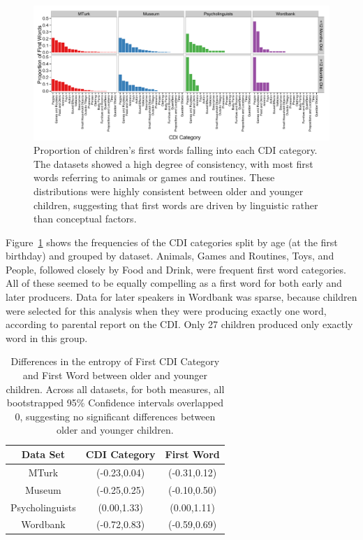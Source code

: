 \documentclass[10pt,letterpaper]{article}
\begin{document}
\begin{figure}[tb]
\begin{center}
\includegraphics[width = .9\textwidth]{figures/cdicats_4sets.pdf}
\end{center}
\caption{Proportion of children's first words falling into each CDI category. The datasets showed a high degree of consistency, with most first words referring to animals or games and routines. These distributions were highly consistent between older and younger children, suggesting that first words are driven by linguistic rather than conceptual factors.}
\label{fig:cdi_cats}
\end{figure}

Figure~\ref{fig:cdi_cats} shows the frequencies of the CDI categories split by age (at the first birthday) and grouped by dataset. Animals, Games and Routines, Toys, and People, followed closely by Food and Drink, were frequent first word categories. All of these seemed to be equally compelling as a first word for both early and later producers. Data for later speakers in Wordbank was sparse, because children were selected for this analysis when they were producing exactly one word, according to parental report on the CDI. Only 27 children produced only exactly word in this group.

\begin{table}[tb]
\centering
\begin{tabular}{ccc}
\hline
Data Set & CDI Category & First Word \\ 
  \hline
  MTurk & (-0.23,0.04) & (-0.31,0.12) \\ 
  Museum & (-0.25,0.25) & (-0.10,0.50) \\ 
  Psycholinguists & (0.00,1.33) & (0.00,1.11) \\ 
  Wordbank & (-0.72,0.83) & (-0.59,0.69) \\ 
   \hline
\end{tabular}
\label{tab:ent_diffs}
\caption{Differences in the entropy of First CDI Category and First Word between older and younger children. Across all datasets, for both measures, all bootstrapped 95\% Confidence intervals overlapped 0, suggesting no significant differences between older and younger children.}
\end{table}
\end{document}
